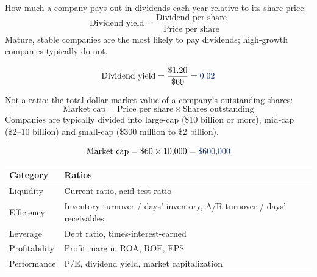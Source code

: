 \begin{definition}
    How much a company pays out in dividends each year relative to its
    share price:
    \[\boxed{\text{Dividend yield} = \frac{\text{Dividend per share}}{\text{Price per share}}}\]
    Mature, stable companies are the most likely to pay dividends; high-growth
    companies typically do not.
\end{definition}
\[\text{Dividend yield} = \frac{\$1.20}{\$60} = \db{0.02}\]

\begin{definition}
    Not a ratio: the total dollar market value of a company's outstanding
    shares:
    \[\boxed{\text{Market cap} = \text{Price per share} \times \text{Shares outstanding}}\]
    Companies are typically divided into \b{large-cap} (\$10 billion or
    more), \b{mid-cap} (\$2--10 billion) and \b{small-cap} (\$300 million
    to \$2 billion).
\end{definition}
\[\text{Market cap} = \$60 \times 10{,}000 = \db{\$600{,}000}\]

\begin{center}
\begin{tabular}{ll}
    \toprule
    Category & Ratios \\
    \midrule
    Liquidity & Current ratio, acid-test ratio \\
    Efficiency & Inventory turnover / days' inventory, A/R turnover / days' receivables \\
    Leverage & Debt ratio, times-interest-earned \\
    Profitability & Profit margin, ROA, ROE, EPS \\
    Performance & P/E, dividend yield, market capitalization \\
    \bottomrule
\end{tabular}
\end{center}
